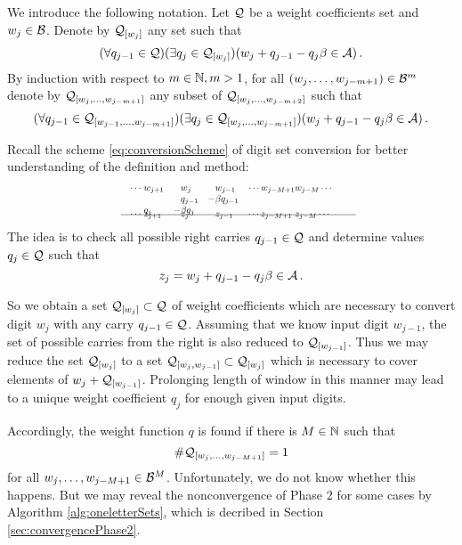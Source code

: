     We introduce the following notation. 
        Let $\mathcal{Q}$ be a weight coefficients set and $w_j\in \mathcal{B}$. Denote by $\mathcal{Q}_{[w_j]}$ any set such that
        $$
            (\forall q_{j-1} \in \mathcal{Q})(\exists q_j \in \mathcal{Q}_{[w_j]})(w_j + q_{j-1} - q_j \beta \in \mathcal{A})\,.
        $$
        By induction with respect to $m \in \mathbb{N}, m>1$, for all $(w_{j},\dots, w_{j-m+1})\in \mathcal{B}^{m}$ denote by $\mathcal{Q}_{[w_{j},\dots, w_{j-m+1}]}$ any subset of  $\mathcal{Q}_{[w_{j},\dots, w_{j-m+2}]}$ such that 
        $$
           (\forall q_{j-1} \in \mathcal{Q}_{[w_{j-1},\dots, w_{j-m+1}]})(\exists q_j \in \mathcal{Q}_{[w_{j},\dots, w_{j-m+1}]})(w_j + q_{j-1} - q_j \beta \in \mathcal{A})\,.
        $$
        
    
  
    Recall the scheme \ref{eq:conversionScheme} of digit set conversion for better understanding of the definition and method:
    \begin{align*}
        \hspace{130pt}\cdots\; &w_{j+1}&\!\! &w_j  & \!\!  &w_{j-1}&\cdots w_{j-M+1} &w_{j-M}\cdots \hspace{130pt} \\[-3pt] 
                         & &       &q_{j-1}& -&\beta q_{j-1} \\[-3pt]
                           &q_j&   -&\beta q_j &&\\[-15pt]      
    \intertext{\hspace{120pt}\line(1,0){250}} 
          \vspace{-15pt}
          \\[-30pt]
     \cdots\; &z_{j+1}& &z_j& &z_{j-1}& \cdots z_{j-M+1}\; &z_{j-M}\cdots                     
    \end{align*}     
    The idea is to check all possible right carries $q_{j-1}\in\mathcal{Q}$ and determine values $q_j\in\mathcal{Q}$ such that 
    $$
    z_j=w_j + q_{j-1} - q_j \beta \in \mathcal{A} \,.
    $$  
    
    So we obtain a set $\mathcal{Q}_{[w_j]}\subset\mathcal{Q}$ of weight coefficients which are necessary to convert digit $w_j$ with any carry $q_{j-1}\in\mathcal{Q}$. Assuming that we know input digit $w_{j-1}$, the set of possible carries from the right is also reduced to $\mathcal{Q}_{[w_{j-1}]}$. Thus we may reduce the set $\mathcal{Q}_{[w_j]}$ to a set $\mathcal{Q}_{[w_j,w_{j-1}]}\subset \mathcal{Q}_{[w_j]}$ which is necessary to cover elements of $w_j + \mathcal{Q}_{[w_{j-1}]}$. Prolonging length of window in this manner may lead to a unique weight coefficient $q_j$ for enough given input digits.  
    
    Accordingly, the weight function $q$ is found if there is $M\in\mathbb{N}$ such that 
    $$
    \#\mathcal{Q}_{[w_{j},\dots, w_{j-M+1}]}=1
    $$
    for all $w_{j},\dots, w_{j-M+1} \in \mathcal{B}^M$. Unfortunately, we do not know whether this happens. But  we may reveal the nonconvergence of Phase 2 for some cases by Algorithm \ref{alg:oneletterSets}, which is decribed in Section \ref{sec:convergencePhase2}. 
    
